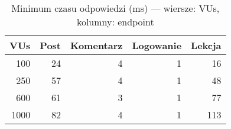 \begin{table}[H]
\centering
\caption{Minimum czasu odpowiedzi (ms) — wiersze: VUs, kolumny: endpoint}
\label{tab:min-vs-vus}
\begin{tabular}{rrrrr}
\toprule
 VUs &  Post &  Komentarz &  Logowanie &  Lekcja \\
\midrule
 100 &    24 &          4 &          1 &      16 \\
 250 &    57 &          4 &          1 &      48 \\
 600 &    61 &          3 &          1 &      77 \\
1000 &    82 &          4 &          1 &     113 \\
\bottomrule
\end{tabular}
\end{table}
